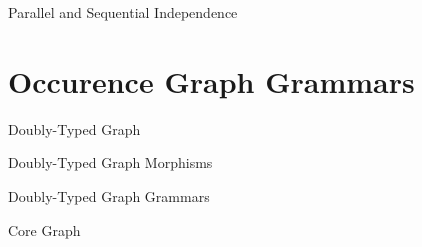 \begin{mydef}{Parallel and Sequential Independence}
\end{mydef}


\section{Occurence Graph Grammars}

\begin{mydef}{Doubly-Typed Graph}
\end{mydef}

\begin{mydef}{Doubly-Typed Graph Morphisms}
\end{mydef}

\begin{mydef}{Doubly-Typed Graph Grammars}
\end{mydef}

\begin{mydef}{Core Graph}
\end{mydef}
